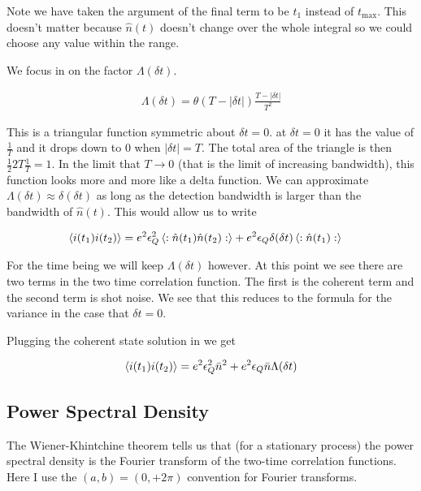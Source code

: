 \documentclass[12pt]{article}
\begin{document}
Note we have taken the argument of the final term to be $t_1$ instead of $t_{\text{max}}$. This doesn't matter because $\hat{n}(t)$ doesn't change over the whole integral so we could choose any value within the range.

We focus in on the factor $\Lambda(\delta t)$. 

\begin{align}
\Lambda(\delta t) = \theta(T - |\delta t|)\frac{T-|\delta t|}{T^2}
\end{align}

This is a triangular function symmetric about $\delta t=0$. at $\delta t=0$ it has the value of $\frac{1}{T}$ and it drops down to 0 when $|\delta t| = T$. The total area of the triangle is then $\frac{1}{2} 2T \frac{1}{T} = 1$. In the limit that $T \rightarrow 0$ (that is the limit of increasing bandwidth), this function looks more and more like a delta function. We can approximate $\Lambda(\delta t) \approx \delta(\delta t)$ as long as the detection bandwidth is larger than the bandwidth of $\hat{n}(t)$. This would allow us to write

\begin{align}
\Braket{i(t_1)i(t_2)} &=e^2 \epsilon_Q^2 \Braket{:\hat{n}(t_1)\hat{n}(t_2):} + e^2 \epsilon_Q \delta(\delta t) \braket{:\hat{n}(t_1):}
\end{align}

For the time being we will keep $\Lambda(\delta t)$ however. At this point we see there are two terms in the two time correlation function. The first is the coherent term and the second term is shot noise. We see that this reduces to the formula for the variance in the case that $\delta t=0$.

Plugging the coherent state solution in we get

\begin{align}
\braket{i(t_1)i(t_2)} = e^2 \epsilon_Q^2 \bar{n}^2 + e^2 \epsilon_Q \bar{n} \Lambda(\delta t)
\end{align}

\subsection{Power Spectral Density}

The Wiener-Khintchine theorem tells us that (for a stationary process) the power spectral density is the Fourier transform of the two-time correlation functions. Here I use the $(a,b) = (0,+2\pi)$ convention for Fourier transforms.
\end{document}
